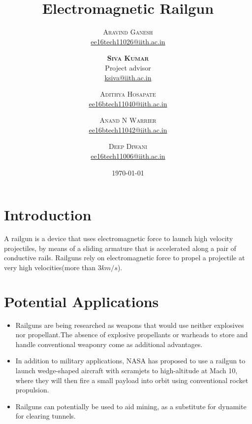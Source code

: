 \documentclass[twocolumn]{article}
\title{Electromagnetic Railgun} %
\author{%
\textsc{Aravind Ganesh}\\[1ex] %
\normalsize \href{mailto:ee16tech11026@iith.ac.in}{ee16tech11026@iith.ac.in}
\and %
\textsc{\textbf{Siva Kumar}}\\
 Project advisor\\
\normalsize \href{mailto:ksiva@iith.ac.in}{ksiva@iith.ac.in} %
\and %
\textsc{Adithya Hosapate}\\[1ex] %
\normalsize \href{mailto:ee16btech11040@iith.ac.in}{ee16btech11040@iith.ac.in} %
\and %
\textsc{Anand N Warrier}\\[1ex] %
\normalsize \href{mailto:ee16btech11042@iith.ac.in}{ee16btech11042@iith.ac.in} %
\and
\textsc{Deep Diwani}\\[1ex] %
\normalsize \href{mailto:ee16tech11006@iith.ac.in}{ee16tech11006@iith.ac.in}
}
\date{\today} %
\begin{document}


\section{Introduction}

	A railgun is a device that uses electromagnetic force to launch high velocity projectiles, by means of a sliding armature that is accelerated along a pair of conductive rails. Railguns rely on electromagnetic force to propel a projectile at very high velocities(more than $3 km/s$).


\section{Potential Applications}
\begin{itemize}

\item Railguns are being researched as weapons that would use neither explosives nor propellant.The absence of explosive propellants or warheads to store and handle conventional weaponry come as additional advantages.

\item In addition to military applications, NASA has proposed to use a railgun to launch wedge-shaped aircraft with scramjets to high-altitude at Mach 10, where they will then fire a small payload into orbit using conventional rocket propulsion.

\item Railguns can potentially be used to aid mining, as a substitute for dynamite for clearing tunnels. 

\end{itemize}
\end{document}

